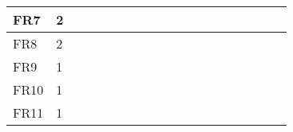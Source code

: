 \begin{table}[]
{\begin{tabular}{|l|l|l|l|l|l|l|l|l|l|l|l|l|l|l|l|l|l|l|}
FR7  & 2                                                     &                                                  &    &    &    &    &                                                  &    &    &    &    &                                                   &    &                                                   &    &                                                             &                                                             &                                                             \\ \hline
FR8  & 2                                                     &                                                  &    &    &    &    &                                                  &    &    &    &    &                                                   &    &                                                   &    &                                                             &                                                             &                                                             \\ \hline
FR9  & 1                                                     &                                                  &    &    &    &    &                                                  &    &    &    &    &                                                   &    &                                                   &    &                                                             &                                                             &                                                             \\ \hline
FR10 & 1                                                     &                                                  &    &    &    &    &                                                  &    &    &    &    &                                                   &    &                                                   &    &                                                             &                                                             &                                                             \\ \hline
FR11 & 1                                                     &                                                  &    &    &    &    &                                                  &    &    &    &    &                                                   &    &                                                   &    &                                                             &                                                             &                                                             \\ \hline

\end{tabular}}
\end{table}
